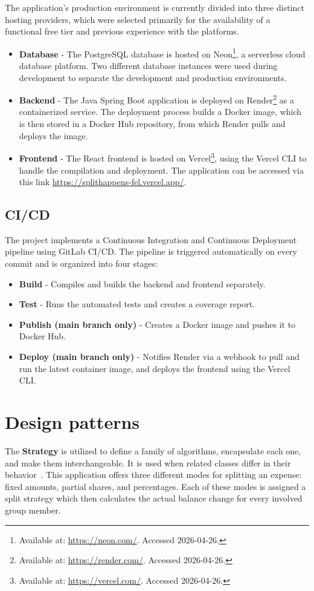 \documentclass{ctuthesis}
\begin{document}
The application's production environment is currently divided into three distinct hosting providers, which were selected primarily for the availability of a functional free tier and previous experience with the platforms.
\begin{itemize}
    \item \textbf{Database} - The PostgreSQL database is hosted on Neon\footnote{Available at: \url{https://neon.com/}. Accessed 2026-04-26.}, a serverless cloud database platform. Two different database instances were used during development to separate the development and production environments.
    \item \textbf{Backend} - The Java Spring Boot application is deployed on Render\footnote{Available at: \url{https://render.com/}. Accessed 2026-04-26.} as a containerized service. The deployment process builds a Docker image, which is then stored in a Docker Hub repository, from which Render pulls and deploys the image.
    \item \textbf{Frontend} - The React frontend is hosted on Vercel\footnote{Available at: \url{https://vercel.com/}. Accessed 2026-04-26.}, using the Vercel CLI to handle the compilation and deployment. The application can be accessed via this link \url{https://splithappens-fel.vercel.app/}.
\end{itemize}

\subsection{CI/CD}
The project implements a Continuous Integration and Continuous Deployment pipeline using GitLab CI/CD. The pipeline is triggered automatically on every commit and is organized into four stages:
\begin{itemize}
    \item \textbf{Build} - Compiles and builds the backend and frontend separately.
    \item \textbf{Test} - Runs the automated tests and creates a coverage report.
    \item \textbf{Publish (main branch only)} - Creates a Docker image and pushes it to Docker Hub.
    \item \textbf{Deploy (main branch only)} - Notifies Render via a webhook to pull and run the latest container image, and deploys the frontend using the Vercel CLI.
\end{itemize}

\section{Design patterns}
The \textbf{Strategy} is utilized to define a family of algorithms, encapsulate each one, and make them interchangeable. It is used when related classes differ in their behavior~\cite{gof}. This application offers three different modes for splitting an expense: fixed amounts, partial shares, and percentages. Each of these modes is assigned a split strategy which then calculates the actual balance change for every involved group member.
\end{document}
